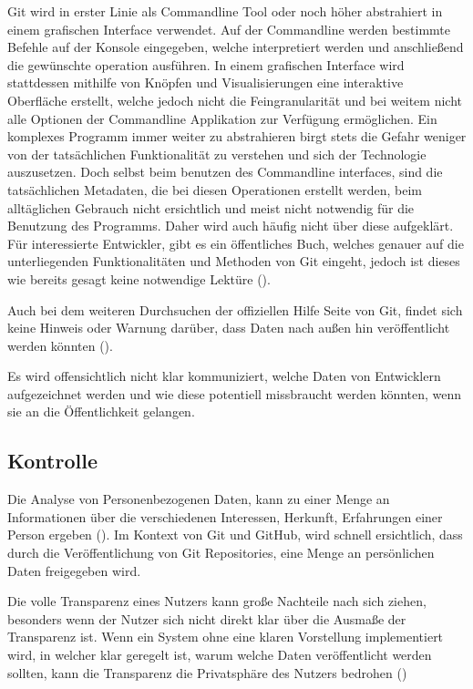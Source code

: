 \documentclass[12pt,a4paper]{article}
\begin{document}
Git wird in erster Linie als Commandline Tool oder noch höher abstrahiert in einem grafischen Interface verwendet.
Auf der Commandline werden bestimmte Befehle auf der Konsole eingegeben, welche interpretiert werden und anschließend die gewünschte operation ausführen.
In einem grafischen Interface wird stattdessen mithilfe von Knöpfen und Visualisierungen eine interaktive Oberfläche erstellt, welche jedoch nicht die Feingranularität und bei weitem nicht alle Optionen der Commandline Applikation zur Verfügung ermöglichen.
Ein komplexes Programm immer weiter zu abstrahieren birgt stets die Gefahr weniger von der tatsächlichen Funktionalität zu verstehen und sich der Technologie auszusetzen.
Doch selbst beim benutzen des Commandline interfaces, sind die tatsächlichen Metadaten, die bei diesen Operationen erstellt werden, beim alltäglichen Gebrauch nicht ersichtlich und meist nicht notwendig für die Benutzung des Programms.
Daher wird auch häufig nicht über diese aufgeklärt.
Für interessierte Entwickler, gibt es ein öffentliches Buch, welches genauer auf die unterliegenden Funktionalitäten und Methoden von Git eingeht, jedoch ist dieses wie bereits gesagt keine notwendige Lektüre (\cite{book:pro-git}).

Auch bei dem weiteren Durchsuchen der offiziellen Hilfe Seite von Git, findet sich keine Hinweis oder Warnung darüber, dass Daten nach außen hin veröffentlicht werden könnten (\cite{online:manpage}).

Es wird offensichtlich nicht klar kommuniziert, welche Daten von Entwicklern aufgezeichnet werden und wie diese potentiell missbraucht werden könnten, wenn sie an die Öffentlichkeit gelangen.


\subsection{Kontrolle}
Die Analyse von Personenbezogenen Daten, kann zu einer Menge an Informationen über die verschiedenen Interessen, Herkunft, Erfahrungen einer Person ergeben (\cite[p.~4-5]{article:corporate}).
Im Kontext von Git und GitHub, wird schnell ersichtlich, dass durch die Veröffentlichung von Git Repositories, eine Menge an persönlichen Daten freigegeben wird.

Die volle Transparenz eines Nutzers kann große Nachteile nach sich ziehen, besonders wenn der Nutzer sich nicht direkt klar über die Ausmaße der Transparenz ist.
Wenn ein System ohne eine klaren Vorstellung implementiert wird, in welcher klar geregelt ist, warum welche Daten veröffentlicht werden sollten, kann die Transparenz die Privatsphäre des Nutzers bedrohen (\cite[p.~6]{article:seeing-knowing})
\end{document}
